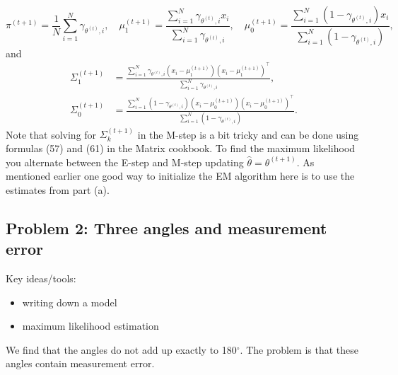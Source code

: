 \begin{itemize}
$$\pi^{(t+1)} = \frac{1}{N} \sum_{i=1}^N \gamma_{\theta^{(t)},i}, \quad \mu_1^{(t+1)} = \frac{ \sum_{i=1}^N \gamma_{\theta^{(t)},i} x_i}{\sum_{i=1}^N  \gamma_{\theta^{(t)},i}  } , \quad \mu_0^{(t+1)} = \frac{\sum_{i=1}^N (1- \gamma_{\theta^{(t)},i} ) x_i}{\sum_{i=1}^N (1- \gamma_{\theta^{(t)},i} ) },$$
and 
\begin{align*} 
	\Sigma_1^{(t+1)}&= \frac{\sum_{i=1}^N \gamma_{\theta^{(t)},i} (x_i - \mu_1^{(t+1)})(x_i -\mu_1^{(t+1)})^\top  }{\sum_{i=1}^N  \gamma_{\theta^{(t)},i}  },\\
	  \Sigma_0^{(t+1)} &= \frac{\sum_{i=1}^N (1-\gamma_{\theta^{(t)},i}  )(x_i - \mu_0^{(t+1)})(x_i -\mu_0^{(t+1)})^\top }{\sum_{i=1}^N (1- \gamma_{\theta^{(t)},i} ) }.
\end{align*}
Note that solving for $\Sigma_k^{(t+1)}$ in the M-step is a bit tricky and can be done using formulas (57) and (61) in the Matrix cookbook. To find the maximum likelihood you alternate between the E-step and M-step updating $\hat{\theta} =\theta^{(t+1)}$. As mentioned earlier one good way to initialize the EM algorithm here is to use the estimates from part (a).
\end{itemize}


\subsection*{Problem 2: Three angles and measurement error}

Key ideas/tools:
\begin{itemize}
\item writing down a model
\item maximum likelihood estimation
\end{itemize}


We find that the angles do not add up exactly to 180$^\circ$. The problem is that these angles contain measurement error.

